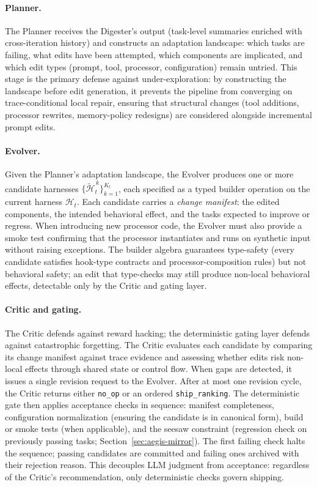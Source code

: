 \paragraph{Planner.}
The Planner receives the Digester's output (task-level summaries enriched with cross-iteration history) and constructs an adaptation landscape: which tasks are failing, what edits have been attempted, which components are implicated, and which edit types (prompt, tool, processor, configuration) remain untried. This stage is the primary defense against under-exploration: by constructing the landscape before edit generation, it prevents the pipeline from converging on trace-conditional local repair, ensuring that structural changes (tool additions, processor rewrites, memory-policy redesigns) are considered alongside incremental prompt edits.

\paragraph{Evolver.}
Given the Planner's adaptation landscape, the Evolver produces one or more candidate harnesses $\{\widetilde{\mathcal{H}}_{t}^{\,k}\}_{k=1}^{K_t}$, each specified as a typed builder operation on the current harness $\mathcal{H}_t$. Each candidate carries a \textit{change manifest}: the edited components, the intended behavioral effect, and the tasks expected to improve or regress. When introducing new processor code, the Evolver must also provide a smoke test confirming that the processor instantiates and runs on synthetic input without raising exceptions. The builder algebra guarantees type-safety (every candidate satisfies hook-type contracts and processor-composition rules) but not behavioral safety; an edit that type-checks may still produce non-local behavioral effects, detectable only by the Critic and gating layer.

\paragraph{Critic and gating.}
The Critic defends against reward hacking; the deterministic gating layer defends against catastrophic forgetting. The Critic evaluates each candidate by comparing its change manifest against trace evidence and assessing whether edits risk non-local effects through shared state or control flow. When gaps are detected, it issues a single revision request to the Evolver. After at most one revision cycle, the Critic returns either \texttt{no\_op} or an ordered \texttt{ship\_ranking}. The deterministic gate then applies acceptance checks in sequence: manifest completeness, configuration normalization (ensuring the candidate is in canonical form), build or smoke tests (when applicable), and the seesaw constraint (regression check on previously passing tasks; Section~\ref{sec:aegis-mirror}). The first failing check halts the sequence; passing candidates are committed and failing ones archived with their rejection reason. This decouples LLM judgment from acceptance: regardless of the Critic's recommendation, only deterministic checks govern shipping.

